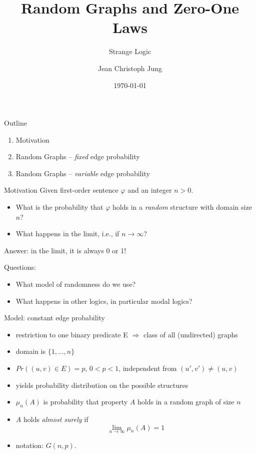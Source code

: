\documentclass[draft]{beamer}
\title[Random Graphs]{Random Graphs and Zero-One Laws}
\subtitle{Strange Logic}
\author[J. Jung]{Jean Christoph Jung}
\institute[TdKI -- Uni Bremen]{Institut f\"ur Theorie der k\"unstlichen Intelligenz\\ Universit\"at Bremen}
\date{\today}
\begin{document}
\titlepage

\begin{frame}{Outline}
\begin{enumerate}
\item Motivation
\item Random Graphs -- \emph{fixed} edge probability
\item Random Graphs -- \emph{variable} edge probability
\end{enumerate}
\end{frame}

\begin{frame}{Motivation}
Given first-order sentence $\varphi$ and an integer $n>0$. 

\begin{itemize}
\item What is the probability that $\varphi$ holds in a \emph{random} structure with domain size $n$?
\item What happens in the limit, \mbox{i.e.}, if $n\rightarrow\infty$?
\end{itemize}

\pause

Answer: in the limit, it is always 0 or 1!

\pause

Questions:
\begin{itemize}
\item What model of randomness do we use?
\item What happens in other logics, in particular modal logics?
\end{itemize}

\end{frame}

\begin{frame}{Model: constant edge probability}
\begin{itemize}
  \item restriction to one binary predicate E $\Rightarrow$ class of all (undirected) graphs 
  \item domain is $\{1,\ldots,n\}$
  \item $Pr( (u,v)\in E)=p$, $0<p<1$, independent from $(u',v')\neq(u,v)$
  \item yields probability distribution on the possible structures
  \item $\mu_n(A)$ is probability that property $A$ holds in a random graph of size $n$
  \item $A$ holds \emph{almost surely} if 
	$$\lim_{n\rightarrow\infty}\mu_n(A)=1$$
  \item notation: $G(n,p)$.
\end{itemize}
\end{frame}
\end{document}
